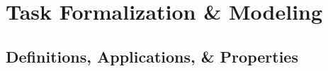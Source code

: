 \section{Task Formalization \& Modeling}

\subsection{Definitions, Applications, \& Properties}

\newcommand{\xset}{\mathbf{X}}
\newcommand{\yset}{\mathbf{Y}}
\newcommand{\gset}{\mathbf{G}}

\newcommand{\dset}{\mathcal{D}}
\newcommand{\xp}{\hat{x}}
\newcommand{\yp}{\hat{y}}

